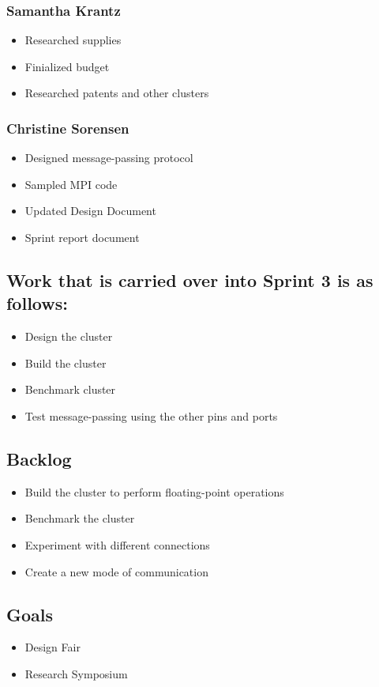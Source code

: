 \subsubsection*{Samantha Krantz}
\begin{itemize}
	\item Researched supplies
	\item Finialized budget
	\item Researched patents and other clusters
\end{itemize}

\subsubsection*{Christine Sorensen}
\begin{itemize}
	\item Designed message-passing protocol
	\item Sampled MPI code
	\item Updated Design Document
	\item Sprint report document
\end{itemize}

\subsection*{Work that is carried over into Sprint 3 is as follows:}
\begin{itemize}
	\item Design the cluster
	\item Build the cluster
	\item Benchmark cluster
	\item Test message-passing using the other pins and ports
\end{itemize}

\subsection*{Backlog}
\begin{itemize}
	\item Build the cluster to perform floating-point operations
	\item Benchmark the cluster
	\item Experiment with different connections
	\item Create a new mode of communication
\end{itemize}

\subsection*{Goals}
\begin{itemize}
	\item Design Fair
	\item Research Symposium
\end{itemize}

